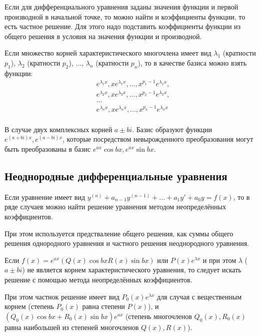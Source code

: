 \documentclass[12pt]{article}
\begin{document}
    Если для дифференциального уравнения заданы значения функции и первой производной в начальной точке, то можно найти и коэффициенты функции, то есть частное решение. Для этого надо подставить коэффициенты функции из общего решения в условия на значения функции и производной.

    Если множество корней характеристического многочлена имеет вид $\lambda_1$ (кратности $p_1$), $\lambda_2$ (кратности $p_2$), ..., $\lambda_n$ (кратности $p_n$), то в качестве базиса можно взять функции:
    \begin{align*}
         & e^{\lambda_1 x}, xe^{\lambda_1 x}, ..., x^{p_1 - 1}e^{\lambda_1 x}, \\
         & e^{\lambda_2 x}, xe^{\lambda_2 x}, ..., x^{p_2 - 1}e^{\lambda_2 x}, \\
         & \dots                                                               \\
         & e^{\lambda_n x}, xe^{\lambda_n x}, ..., x^{p_n - 1}e^{\lambda_n x}  \\
    \end{align*}

    В случае двух комплексных корней $a \pm bi$. Базис образуют функции $e^{(a + bi)x}, e^{(a - bi)x}$, которые посредством невырожденного преобразования могут быть преобразованы в базис $e^{ax}\cos{bx}, e^{ax}\sin{bx}$.

    \subsection{Неоднородные дифференциальные уравнения}
    Если уравнение имеет вид $y^{(n)} + a_{n-1}y^{(n - 1)} + ... + a_1y' + a_0y = f(x)$, то в ряде случаев можно найти решение уравнения методом неопределённых коэффициентов.

    При этом используется предстваление общего решения, как суммы общего решения однородного уравнения и частного решения неоднородного уравнения.

    Если $f(x) = e^{ax}(Q(x)\cos{bx} R(x)\sin{bx})$ или $P(x)e^{\lambda x}$ и при этом $\lambda$ ($a \pm bi$) не является корнем характеристического уравнения, то следует искать решение с помощью метода неопределённых коэффициентов.

    При этом частнок решение имеет вид $P_0(x)e^{\lambda x}$ для случая с вещественным корнем (степень $P_0(x)$ равна степени $P(x)$), и $(Q_0(x)\cos{bx} + R_0(x)\sin{bx})e^{ax}$ (степень многочленов $Q_0(x), R_0(x)$ равна наибольшей из степеней многочленов $Q(x), R(x)$).
\end{document}
